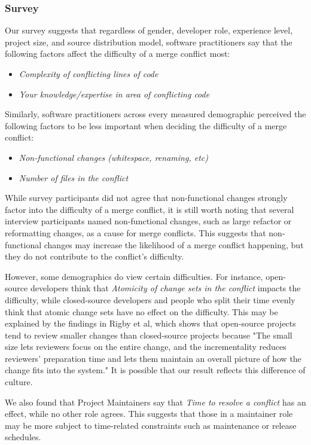\subsubsection{Survey}
Our survey suggests that regardless of gender, developer role, experience level, project size, and source distribution model, software practitioners say that the following factors affect the difficulty of a merge conflict most: 
\begin{itemize}
\item \textit{Complexity of conflicting lines of code}
\item \textit{Your knowledge/expertise in area of conflicting code}
\end{itemize}

Similarly, software practitioners across every measured demographic perceived the following factors to be less important when deciding the difficulty of a merge conflict:
\begin{itemize}
\item \textit{Non-functional changes (whitespace, renaming, etc)}
\item \textit{Number of files in the conflict}
\end{itemize}

While survey participants did not agree that non-functional changes strongly factor into the difficulty of a merge conflict, it is still worth noting that several interview participants named non-functional changes, such as large refactor or reformatting changes, as a cause for merge conflicts. This suggests that non-functional changes may increase the likelihood of a merge conflict happening, but they do not contribute to the conflict's difficulty.

However, some demographics do view certain difficulties. For instance, open-source developers think that \textit{Atomicity of change sets in the conflict} impacts the difficulty, while closed-source developers and people who split their time evenly think that atomic change sets have no effect on the difficulty. This may be explained by the findings in Rigby et al\cite{OSS_smaller_commits}, which shows that open-source projects tend to review smaller changes than closed-source projects because "The small size lets reviewers focus on the entire change, and the incrementality reduces reviewers’ preparation time and lets them maintain an overall picture of how the change fits into the system." It is possible that our result reflects this difference of culture.

We also found that Project Maintainers say that \textit{Time to resolve a conflict} has an effect, while no other role agrees. This suggests that those in a maintainer role may be more subject to time-related constraints such as maintenance or release schedules. 

